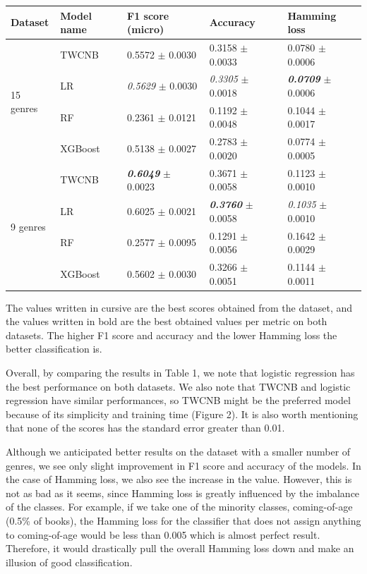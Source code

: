 \documentclass{article}
\begin{document}
\begin{minipage}{\linewidth}
\centering
{}
\label{tab:title}
\begin{tabular}{lllll}
\toprule
Dataset & Model name & F1 score (micro) & Accuracy & Hamming loss\\
\midrule
\multirow{4}{*}{15 genres} & TWCNB & 0.5572 $\pm$ 0.0030 & 0.3158 $\pm$ 0.0033 & 0.0780 $\pm$ 0.0006\\ \cmidrule{2-5}
 & LR & \textit{0.5629} $\pm$ 0.0030 & \textit{0.3305} $\pm$ 0.0018 & \textbf{\textit{0.0709}} $\pm$ 0.0006 \\ \cmidrule{2-5}
 & RF & 0.2361 $\pm$ 0.0121 & 0.1192 $\pm$ 0.0048 & 0.1044 $\pm$ 0.0017 \\ \cmidrule{2-5}
 & XGBoost & 0.5138 $\pm$ 0.0027 & 0.2783 $\pm$ 0.0020 & 0.0774 $\pm$ 0.0005 \\
 \midrule
\multirow{4}{*}{9 genres} & TWCNB & \textbf{\textit{0.6049}} $\pm$ 0.0023 & 0.3671 $\pm$ 0.0058 & 0.1123 $\pm$ 0.0010 \\ \cmidrule{2-5}
 & LR & 0.6025 $\pm$ 0.0021 & \textbf{\textit{0.3760}} $\pm$ 0.0058 & \textit{0.1035} $\pm$ 0.0010 \\ \cmidrule{2-5}
 & RF & 0.2577 $\pm$ 0.0095 & 0.1291 $\pm$ 0.0056 & 0.1642 $\pm$ 0.0029 \\ \cmidrule{2-5}
 & XGBoost & 0.5602 $\pm$ 0.0030 & 0.3266 $\pm$ 0.0051 & 0.1144 $\pm$ 0.0011 \\
\bottomrule
\end{tabular}\par
\vspace{.5em}
\small{The values written in cursive are the best scores obtained from the dataset, and the values written in bold are the best obtained values per metric on both datasets. The higher F1 score and accuracy and the lower Hamming loss the better classification is.}
\end{minipage} \vspace{.5em}
\par Overall, by comparing the results in Table 1, we note that logistic regression has the best performance on both datasets. We also note that TWCNB and logistic regression have similar performances, so TWCNB might be the preferred model because of its simplicity and training time (Figure 2). It is also worth mentioning that none of the scores has the standard error greater than 0.01.
\par Although we anticipated better results on the dataset with a smaller number of genres, we see only slight improvement in F1 score and accuracy of the models. In the case of Hamming loss, we also see the increase in the value. However, this is not as bad as it seems, since Hamming loss is greatly influenced by the imbalance of the classes. For example, if we take one of the minority classes, coming-of-age (0.5\% of books), the Hamming loss for the classifier that does not assign anything to coming-of-age would be less than 0.005 which is almost perfect result. Therefore, it would drastically pull the overall Hamming loss down and make an illusion of good classification.
\end{document}
